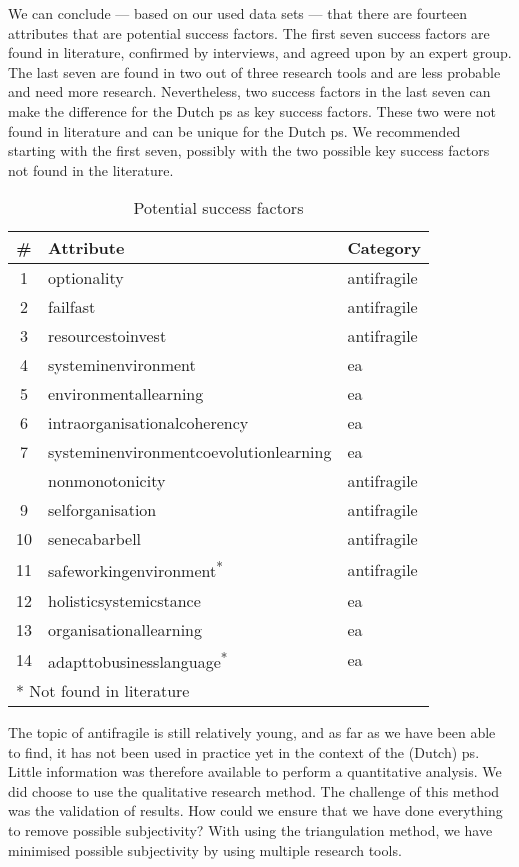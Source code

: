We can conclude --- based on our used data sets --- that there are fourteen \glspl{attribute} that are potential success factors. The first seven success factors are found in literature, confirmed by interviews, and agreed upon by an expert group. The last seven are found in two out of three research tools and are less probable and need more research. Nevertheless, two success factors in the last seven can make the difference for the Dutch \gls{ps} as key success factors. These two were not found in literature and can be unique for the Dutch \gls{ps}. We recommended starting with the first seven, possibly with the two possible key success factors not found in the literature.
\begin{table}[H]
	\centering
	\small
	\begin{tabular}{@{}cll@{}}
		\toprule
		\textbf{\#} & \textbf{Attribute} & \textbf{Category} \\%
		\midrule
		1 & \Gls{optionality} & \Gls{antifragile} \\%
		2 & \Gls{failfast} & \Gls{antifragile} \\%
		3 & \Gls{resourcestoinvest} & \Gls{antifragile} \\%
		4 & \Gls{systeminenvironment} & \gls{ea} \\%
		5 & \Gls{environmentallearning} & \gls{ea} \\%
		6 & \Gls{intraorganisationalcoherency} & \gls{ea} \\%
		7 & \Gls{systeminenvironmentcoevolutionlearning} & \gls{ea} \\%
		\hdashline %
		8 & \Gls{nonmonotonicity} & \Gls{antifragile}  \\%
		9 & \Gls{selforganisation} & \Gls{antifragile}  \\%
		10 & \Gls{senecabarbell} & \Gls{antifragile}  \\%
		11 & \Gls{safeworkingenvironment}\textsuperscript{*} & \Gls{antifragile}  \\%
		12 & \Gls{holisticsystemicstance} & \gls{ea}  \\%
		13 & \Gls{organisationallearning} & \gls{ea}  \\%
		14 & \Gls{adapttobusinesslanguage}\textsuperscript{*} & \gls{ea}  \\%
		\bottomrule
		\multicolumn{2}{l}{* Not found in literature}
	\end{tabular}%
	\caption*{Potential success factors}
	\label{executive:potentialsuccess}%
\end{table}%
The topic of \gls{antifragile} is still relatively young, and as far as we have been able to find, it has not been used in practice yet in the context of the (Dutch) \gls{ps}. Little information was therefore available to perform a quantitative analysis. We did choose to use the qualitative research method. The challenge of this method was the validation of results. How could we ensure that we have done everything to remove possible subjectivity? With using the triangulation method, we have minimised possible subjectivity by using multiple research tools. 

